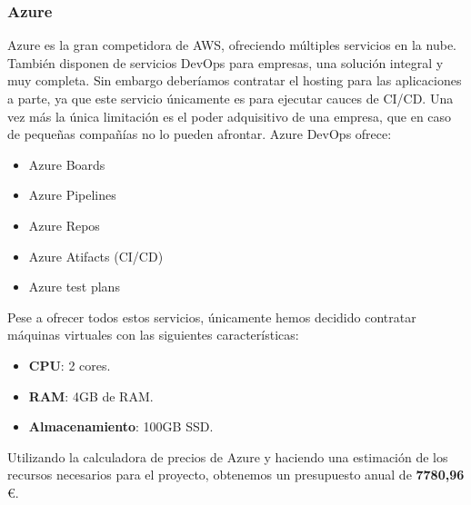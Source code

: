 		\subsubsection{Azure}
			\begin{text}
				Azure es la gran competidora de AWS, ofreciendo múltiples servicios en la nube. También disponen de servicios DevOps \cite{AzureDev63:online} para empresas, una solución integral y muy completa. Sin embargo deberíamos contratar el hosting para las aplicaciones a parte, ya que este servicio únicamente es para ejecutar cauces de CI/CD. Una vez más la única limitación es el poder adquisitivo de una empresa, que en caso de pequeñas compañías no lo pueden afrontar. Azure DevOps ofrece:
				\begin{itemize}
					\item Azure Boards
					\item Azure Pipelines
					\item Azure Repos
					\item Azure Atifacts (CI/CD)
					\item Azure test plans
				\end{itemize}
			
			Pese a ofrecer todos estos servicios, únicamente hemos decidido contratar máquinas virtuales con las siguientes características:
			
			\begin{itemize}
				\item \textbf{CPU}: 2 cores.
				\item \textbf{RAM}: 4GB de RAM.
				\item \textbf{Almacenamiento}: 100GB SSD.
			\end{itemize}
		
				Utilizando la calculadora de precios de Azure \cite{azurecalculadora:online} y haciendo una estimación de los recursos necesarios para el proyecto, obtenemos un presupuesto anual de \textbf{7780,96} \euro.
			\end{text}
	
		

